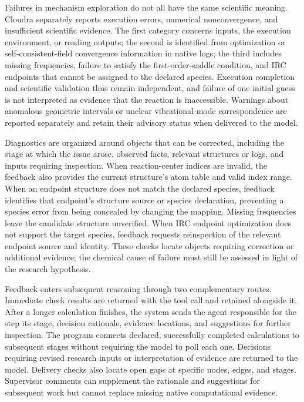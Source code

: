 Failures in mechanism exploration do not all have the same scientific meaning. Cloudra separately reports execution errors, numerical nonconvergence, and insufficient scientific evidence. The first category concerns inputs, the execution environment, or reading outputs; the second is identified from optimization or self-consistent-field convergence information in native logs; the third includes missing frequencies, failure to satisfy the first-order-saddle condition, and IRC endpoints that cannot be assigned to the declared species. Execution completion and scientific validation thus remain independent, and failure of one initial guess is not interpreted as evidence that the reaction is inaccessible. Warnings about anomalous geometric intervals or unclear vibrational-mode correspondence are reported separately and retain their advisory status when delivered to the model.

Diagnostics are organized around objects that can be corrected, including the stage at which the issue arose, observed facts, relevant structures or logs, and inputs requiring inspection. When reaction-center indices are invalid, the feedback also provides the current structure's atom table and valid index range. When an endpoint structure does not match the declared species, feedback identifies that endpoint's structure source or species declaration, preventing a species error from being concealed by changing the mapping. Missing frequencies leave the candidate structure unverified. When IRC endpoint optimization does not support the target species, feedback requests reinspection of the relevant endpoint source and identity. These checks locate objects requiring correction or additional evidence; the chemical cause of failure must still be assessed in light of the research hypothesis.

Feedback enters subsequent reasoning through two complementary routes. Immediate check results are returned with the tool call and retained alongside it. After a longer calculation finishes, the system sends the agent responsible for the step its stage, decision rationale, evidence locations, and suggestions for further inspection. The program connects declared, successfully completed calculations to subsequent stages without requiring the model to poll each one. Decisions requiring revised research inputs or interpretation of evidence are returned to the model. Delivery checks also locate open gaps at specific nodes, edges, and stages. Supervisor comments can supplement the rationale and suggestions for subsequent work but cannot replace missing native computational evidence.

